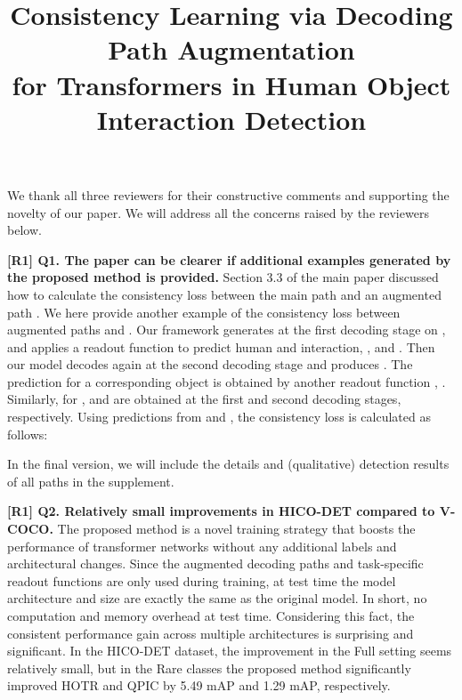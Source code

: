 \documentclass[10pt,twocolumn,letterpaper]{article}
\newcommand{\hjk}[1]{{\color{black}#1}}
\newcommand{\jhp}[1]{{\color{black}#1}}
\begin{document}
\title{Consistency Learning via Decoding Path Augmentation \\for Transformers in Human Object Interaction Detection}  

\maketitle
\thispagestyle{empty}
\appendix
\hjk{We thank all three reviewers for their constructive comments and  supporting the novelty of our paper. 
We will address all the concerns raised by the reviewers below.


\jhp{\noindent\textbf{[R1] Q1. The paper can be clearer if additional examples generated by the proposed method is provided.}}
\newline
Section 3.3 of the main paper discussed how to calculate the consistency loss between the main path  and an augmented path .
We here provide another example of the consistency loss between augmented paths  and .
Our framework generates  at the first decoding stage on , and applies a readout function to predict human and interaction, \ie,  and . 
Then our model decodes  again at the second decoding stage and produces . 
The prediction for a corresponding object is obtained by another readout function \ie, .
Similarly, for ,  and  are obtained at the first and second decoding stages, respectively.
Using predictions from  and , the consistency loss is calculated as follows:
\setlength{\abovedisplayskip}{-1pt}

In the final version, we will include the details and (qualitative) detection results of all paths in the supplement.}





\hjk{\noindent\textbf{[R1] Q2. Relatively small improvements in HICO-DET compared to V-COCO.}\newline
The proposed method is a novel training strategy that boosts the performance of transformer networks without any additional labels and architectural changes.
Since the augmented decoding paths and task-specific readout functions are only used during training, at test time the model architecture and size are exactly the same as the original model. In short, no computation and memory overhead at test time.  
Considering this fact, the consistent performance gain across multiple architectures is surprising and significant. 
In the HICO-DET dataset, the improvement in the Full setting seems relatively small, but in the Rare classes the proposed method significantly improved HOTR and QPIC by 5.49 mAP and 1.29 mAP, respectively.}
\end{document}
